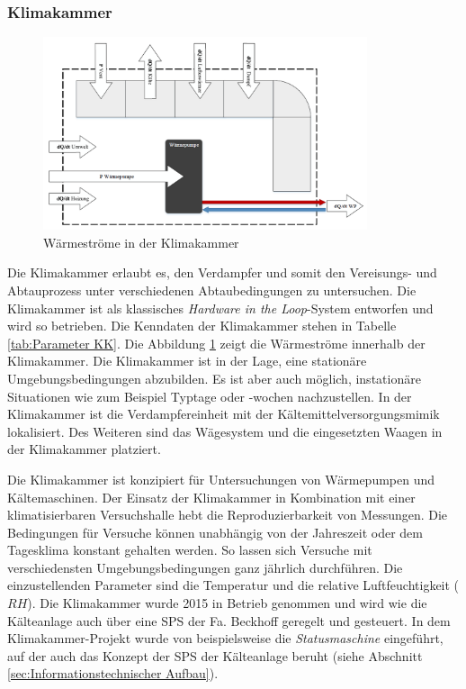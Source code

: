 
\newpage
\subsubsection{Klimakammer}
\label{subsec:Klimakammer}
\begin{figure}[htb]
\centering		\includegraphics[width=0.850\textwidth]{Pictures/HIL2.png}
\caption{Wärmeströme in der Klimakammer \citep{Nuerenberg2015}}
\label{fig:KK}
\end{figure}


Die Klimakammer erlaubt es, den Verdampfer und somit den Vereisungs- und Abtauprozess unter verschiedenen Abtaubedingungen zu untersuchen. Die Klimakammer ist als klassisches \textit{Hardware in the Loop}-System entworfen und wird so betrieben.  Die Kenndaten der Klimakammer stehen in Tabelle \ref{tab:Parameter KK}. Die Abbildung \ref{fig:KK} zeigt die Wärmeströme innerhalb der Klimakammer. Die Klimakammer ist in der Lage, eine stationäre Umgebungsbedingungen abzubilden. Es ist aber auch möglich, instationäre Situationen wie zum Beispiel Typtage oder -wochen nachzustellen. 
In der Klimakammer ist die Verdampfereinheit mit der Kältemittelversorgungsmimik lokalisiert. Des Weiteren sind das Wägesystem und die eingesetzten Waagen in der Klimakammer platziert. 



Die Klimakammer ist konzipiert für  Untersuchungen von Wärmepumpen und Kältemaschinen. Der Einsatz der Klimakammer in Kombination mit einer klimatisierbaren Versuchshalle hebt die Reproduzierbarkeit von Messungen. Die Bedingungen für Versuche können unabhängig von der Jahreszeit oder dem Tagesklima konstant gehalten werden. So lassen sich Versuche mit verschiedensten Umgebungsbedingungen ganz jährlich durchführen.  Die einzustellenden Parameter sind die Temperatur und die relative Luftfeuchtigkeit ($RH$). Die Klimakammer wurde 2015 in Betrieb genommen und wird wie die Kälteanlage auch über eine SPS der Fa. Beckhoff geregelt und gesteuert. In dem Klimakammer-Projekt wurde von \textsc{\citeauthor{Nuerenberg2015}} beispielsweise die \textit{Statusmaschine} eingeführt, auf der auch das Konzept der SPS der Kälteanlage beruht (siehe Abschnitt \ref{sec:Informationstechnischer Aufbau}). 

